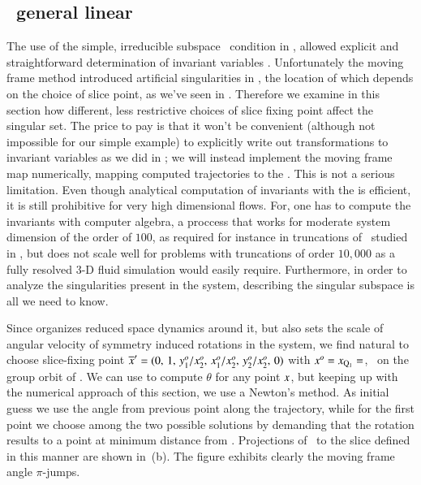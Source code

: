 
\subsection{\label{s:mfReqb}\CLe\  general linear \slice}

The use of the simple, irreducible subspace \slice\ condition in ,
 allowed explicit and straightforward determination of invariant
variables . Unfortunately the moving frame method introduced artificial
singularities in \reducedsp, the location of which depends on the choice of slice point,
as we've seen in .
Therefore we examine in this section how different, less restrictive choices of slice fixing
point affect the singular set. The price to pay is that it won't be convenient (although not
impossible for our simple example) to explicitly write out transformations
to invariant variables as we did in ;
we will instead implement the moving frame map numerically,
mapping computed trajectories to the \slice.
This is not a serious limitation. Even though analytical computation
of invariants with the {\mframes} is efficient, it is still
prohibitive for very high dimensional flows. For, one has
to compute the invariants with computer algebra, a proccess
that works for moderate system dimension of the order of $100$,
as required for instance in truncations of \KSe\ studied in ,
but does not scale well for problems with truncations of order $10,000$ as
a fully resolved $3$-D fluid simulation would easily require.
Furthermore, in order to analyze the singularities present in the system, 
describing the singular subspace is all we need to know.

Since  organizes reduced space dynamics around it, but also sets the
scale of angular velocity of symmetry induced rotations in the system, we
find natural to choose slice-fixing point ${\overline{x}'}=(0,\,1,\,y_1^{o}/x_2^{o},\,x_1^{o}/x_2^{o},\,y_2^{o}/x_2^{o},\,0)$
with $x^{o}= x_{\mathrm{Q}_{1}}=$, \ie\ on the group orbit of \reqv.
We can use  to compute $\theta$ for any point $x$, but keeping up
with the numerical approach of this section, we use a Newton's method. As initial
guess we use the angle from previous point along the trajectory, while for the
first point we choose among the two possible solutions by demanding that the rotation
results to a point at minimum distance from \slicep.
Projections of \cLf\ to the slice defined in this manner are
shown in \,(b).
The figure exhibits clearly the moving frame angle $\pi$-jumps.

